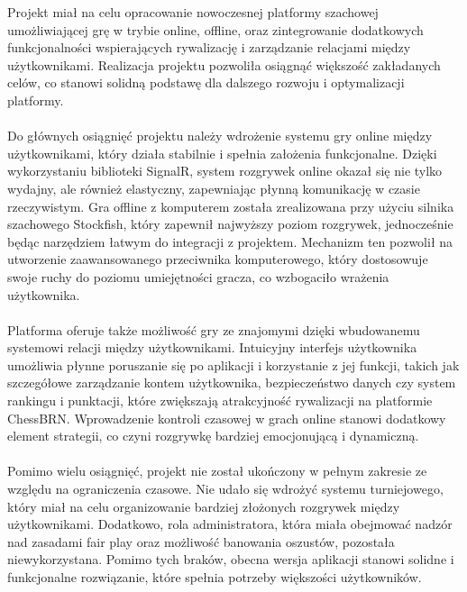 \documentclass[twoside]{projektInzynierskiMS1}
\begin{document}
\noindent
Projekt miał na celu opracowanie nowoczesnej platformy szachowej umożliwiającej grę w trybie online, offline, oraz zintegrowanie dodatkowych funkcjonalności wspierających rywalizację i zarządzanie relacjami między użytkownikami. Realizacja projektu pozwoliła osiągnąć większość zakładanych celów, co stanowi solidną podstawę dla dalszego rozwoju i optymalizacji platformy.
\\\\
Do głównych osiągnięć projektu należy wdrożenie systemu gry online między użytkownikami, który działa stabilnie i spełnia założenia funkcjonalne. Dzięki wykorzystaniu biblioteki SignalR, system rozgrywek online okazał się nie tylko wydajny, ale również elastyczny, zapewniając płynną komunikację w czasie rzeczywistym. Gra offline z komputerem została zrealizowana przy użyciu silnika szachowego Stockfish, który zapewnił najwyższy poziom rozgrywek, jednocześnie będąc narzędziem łatwym do integracji z projektem. Mechanizm ten pozwolił na utworzenie zaawansowanego przeciwnika komputerowego, który dostosowuje swoje ruchy do poziomu umiejętności gracza, co wzbogaciło wrażenia użytkownika.
\\\\
Platforma oferuje także możliwość gry ze znajomymi dzięki wbudowanemu systemowi relacji między użytkownikami. Intuicyjny interfejs użytkownika umożliwia płynne poruszanie się po aplikacji i korzystanie z jej funkcji, takich jak szczegółowe zarządzanie kontem użytkownika, bezpieczeństwo danych czy system rankingu i punktacji, które zwiększają atrakcyjność rywalizacji na platformie ChessBRN. Wprowadzenie kontroli czasowej w grach online stanowi dodatkowy element strategii, co czyni rozgrywkę bardziej emocjonującą i dynamiczną.
\\\\
Pomimo wielu osiągnięć, projekt nie został ukończony w pełnym zakresie ze względu na ograniczenia czasowe. Nie udało się wdrożyć systemu turniejowego, który miał na celu organizowanie bardziej złożonych rozgrywek między użytkownikami. Dodatkowo, rola administratora, która miała obejmować nadzór nad zasadami fair play oraz możliwość banowania oszustów, pozostała niewykorzystana. Pomimo tych braków, obecna wersja aplikacji stanowi solidne i funkcjonalne rozwiązanie, które spełnia potrzeby większości użytkowników.

\newpage
\end{document}
